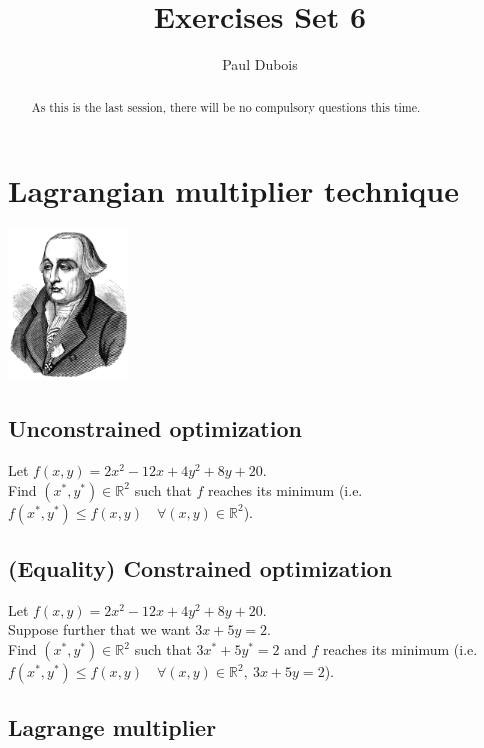 \documentclass[]{article}
\title{Exercises Set 6}
\author{Paul Dubois}
\newcommand{\R}{\mathbb{R}}
\begin{document}
	
	\maketitle
	
	\begin{abstract}
		As this is the last session, there will be no compulsory questions this time.
	\end{abstract}	
	
	\section{Lagrangian multiplier technique}
	\begin{center}
		\includegraphics[height=4cm]{Lagrange}
	\end{center}

	\subsection{Unconstrained optimization}
	Let $f(x,y) = 2x^2-12x + 4y^2 + 8y + 20$.\\
	Find $(x^*,y^*) \in \R^2$ such that $f$ reaches its minimum (i.e. $f(x^*,y^*) \leq f(x,y) \quad \forall (x,y) \in \R^2$).
	
	\subsection{(Equality) Constrained optimization}
	Let $f(x,y) = 2x^2-12x + 4y^2 + 8y + 20$.\\
	Suppose further that we want $3x + 5y = 2$.\\
	Find $(x^*,y^*) \in \R^2$ such that $3x^* + 5y^* = 2$ and $f$ reaches its minimum (i.e. $f(x^*,y^*) \leq f(x,y) \quad \forall (x,y) \in \R^2,\ 3x + 5y = 2$).
	
	\subsection{Lagrange multiplier}
\end{document}

